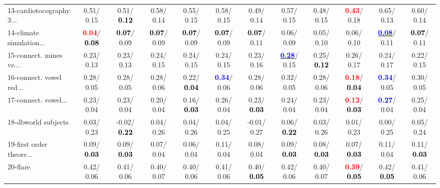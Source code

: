 \begin{table}[h]
\begin{center}
{\begin{tabular}{lc|c|c|c|c|c|c|c|c|c|c}
13-cardiotocography 3... &   0.51/  0.15 &   0.51/\textcolor{black}{\textbf{  0.12}} &   0.58/  0.14 &   0.55/  0.15 &   0.58/  0.15 &   0.49/  0.14 &   0.57/  0.15 &   0.48/  0.15 & \textcolor{red}{\textbf{  0.43}}/  0.18 &   0.65/  0.13 &   0.60/  0.14 \\
14-climate simulation... & \textcolor{red}{\textbf{  0.04}}/\textcolor{black}{\textbf{  0.08}} & \textcolor{black}{\textbf{  0.07}}/  0.09 & \textcolor{black}{\textbf{  0.07}}/  0.09 & \textcolor{black}{\textbf{  0.07}}/  0.09 & \textcolor{black}{\textbf{  0.07}}/  0.09 & \textcolor{black}{\textbf{  0.07}}/  0.11 &   0.06/  0.09 &   0.05/  0.10 &   0.06/  0.10 & \underline{\textcolor{blue}{\textbf{  0.08}}}/  0.11 & \textcolor{black}{\textbf{  0.07}}/  0.11 \\ \hline
15-connect. mines vs... &   0.23/  0.13 &   0.23/  0.13 &   0.24/  0.15 &   0.24/  0.15 &   0.24/  0.15 &   0.23/  0.16 & \underline{\textcolor{blue}{\textbf{  0.28}}}/  0.15 &   0.25/\textcolor{black}{\textbf{  0.12}} &   0.26/  0.17 &   0.24/  0.17 &   0.22/  0.15 \\
16-connect. vowel red... &   0.28/  0.05 &   0.28/  0.05 &   0.28/  0.06 &   0.22/\textcolor{black}{\textbf{  0.04}} & \textcolor{blue}{\textbf{  0.34}}/  0.06 &   0.28/  0.06 &   0.32/  0.05 &   0.28/  0.06 & \textcolor{red}{\textbf{  0.18}}/\textcolor{black}{\textbf{  0.04}} & \textcolor{blue}{\textbf{  0.34}}/  0.05 &   0.30/  0.05 \\
17-connect. vowel... &   0.23/  0.04 &   0.23/  0.04 &   0.20/  0.04 &   0.16/\textcolor{black}{\textbf{  0.03}} &   0.26/  0.04 &   0.23/\textcolor{black}{\textbf{  0.03}} &   0.24/  0.04 &   0.23/  0.04 & \textcolor{red}{\textbf{  0.12}}/\textcolor{black}{\textbf{  0.03}} & \textcolor{blue}{\textbf{  0.27}}/  0.04 &   0.25/  0.04 \\
18-dbworld subjects &   0.03/  0.23 &  -0.02/\textcolor{black}{\textbf{  0.22}} &   0.04/  0.26 &   0.04/  0.26 &   0.04/  0.25 &  -0.01/  0.27 &   0.06/\textcolor{black}{\textbf{  0.22}} &   0.03/  0.26 &   0.01/  0.23 &   0.00/  0.25 &   0.05/  0.24 \\
19-first order theore... &   0.09/\textcolor{black}{\textbf{  0.03}} &   0.09/\textcolor{black}{\textbf{  0.03}} &   0.07/  0.04 &   0.06/  0.04 &   0.11/  0.04 &   0.08/  0.04 &   0.09/\textcolor{black}{\textbf{  0.03}} &   0.08/\textcolor{black}{\textbf{  0.03}} &   0.07/\textcolor{black}{\textbf{  0.03}} &   0.11/  0.04 &   0.11/\textcolor{black}{\textbf{  0.03}} \\
20-flare &   0.42/  0.06 &   0.41/  0.06 &   0.40/  0.07 &   0.40/  0.06 &   0.41/  0.06 &   0.40/\textcolor{black}{\textbf{  0.05}} &   0.42/  0.06 &   0.40/  0.07 & \textcolor{red}{\textbf{  0.39}}/\textcolor{black}{\textbf{  0.05}} &   0.42/\textcolor{black}{\textbf{  0.05}} &   0.41/  0.06 \\

\end{tabular}}
\end{center}
\end{table}
